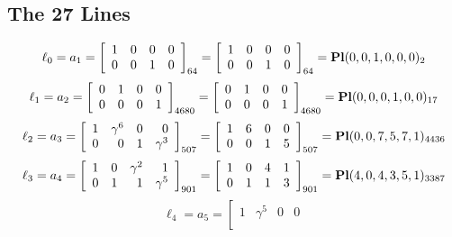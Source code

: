 \documentclass{article}
\begin{document}
{\subsection*{The 27 Lines}
$$
\ell_{0} = a_{1} = 
\left[
\begin{array}{*{4}{r}}
1 & 0 & 0 & 0\\
0 & 0 & 1 & 0\\
\end{array}
\right]
_{64}
=
\left[
\begin{array}{*{4}c}
1  & 0  & 0  & 0\\
0  & 0  & 1  & 0\\
\end{array}
\right]_{64}
={\rm\bf Pl}(0,0,1,0,0,0 )_{2}$$
$$
\ell_{1} = a_{2} = 
\left[
\begin{array}{*{4}{r}}
0 & 1 & 0 & 0\\
0 & 0 & 0 & 1\\
\end{array}
\right]
_{4680}
=
\left[
\begin{array}{*{4}c}
0  & 1  & 0  & 0\\
0  & 0  & 0  & 1\\
\end{array}
\right]_{4680}
={\rm\bf Pl}(0,0,0,1,0,0 )_{17}$$
$$
\ell_{2} = a_{3} = 
\left[
\begin{array}{*{4}{r}}
1 & \gamma^{6} & 0 & 0\\
0 & 0 & 1 & \gamma^{3}\\
\end{array}
\right]
_{507}
=
\left[
\begin{array}{*{4}c}
1  & 6  & 0  & 0\\
0  & 0  & 1  & 5\\
\end{array}
\right]_{507}
={\rm\bf Pl}(0,0,7,5,7,1 )_{4436}$$
$$
\ell_{3} = a_{4} = 
\left[
\begin{array}{*{4}{r}}
1 & 0 & \gamma^{2} & 1\\
0 & 1 & 1 & \gamma^{5}\\
\end{array}
\right]
_{901}
=
\left[
\begin{array}{*{4}c}
1  & 0  & 4  & 1\\
0  & 1  & 1  & 3\\
\end{array}
\right]_{901}
={\rm\bf Pl}(4,0,4,3,5,1 )_{3387}$$
$$
\ell_{4} = a_{5} = 
\left[
\begin{array}{*{4}{r}}
1 & \gamma^{5} & 0 & 0\\

\end{array}$$}
\end{document}
